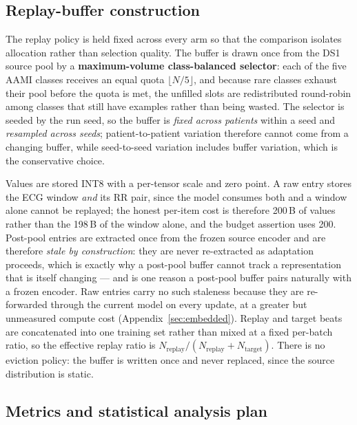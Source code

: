 \subsection{Replay-buffer construction}
\label{sec:replay_policy}

The replay policy is held fixed across every arm so that the comparison isolates
allocation rather than selection quality. The buffer is drawn once from the DS1
source pool by a \textbf{maximum-volume class-balanced selector}: each of the
five AAMI classes receives an equal quota $\lfloor N/5 \rfloor$, and because rare
classes exhaust their pool before the quota is met, the unfilled slots are
redistributed round-robin among classes that still have examples rather than
being wasted. The selector is seeded by the run seed, so the buffer is
\emph{fixed across patients} within a seed and \emph{resampled across seeds};
patient-to-patient variation therefore cannot come from a changing buffer, while
seed-to-seed variation includes buffer variation, which is the conservative
choice.

Values are stored INT8 with a per-tensor scale and zero point. A raw entry stores
the ECG window \emph{and} its RR pair, since the model consumes both and a window
alone cannot be replayed; the honest per-item cost is therefore 200\,B of values
rather than the 198\,B of the window alone, and the budget assertion uses 200.
Post-pool entries are extracted once from the frozen source encoder and are
therefore \emph{stale by construction}: they are never re-extracted as adaptation
proceeds, which is exactly why a post-pool buffer cannot track a representation
that is itself changing --- and is one reason a post-pool buffer pairs naturally
with a frozen encoder. Raw entries carry no such staleness because they are
re-forwarded through the current model on every update, at a greater but
unmeasured compute cost (Appendix~\ref{sec:embedded}). Replay and target beats are
concatenated into one training set rather than mixed at a fixed per-batch ratio,
so the effective replay ratio is $N_{\mathrm{replay}} / (N_{\mathrm{replay}} +
N_{\mathrm{target}})$. There is no eviction policy: the buffer is written once
and never replaced, since the source distribution is static.

\subsection{Metrics and statistical analysis plan}


